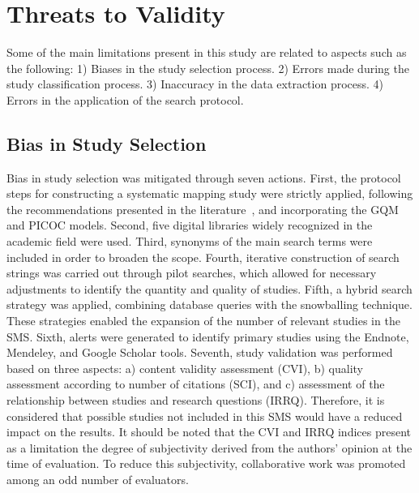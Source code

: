 \section{Threats to Validity}\label{sec:amenazas-validez}
Some of the main limitations present in this study are related to aspects such as the following: 1) Biases in the study selection process. 2) Errors made during the study classification process. 3) Inaccuracy in the data extraction process. 4) Errors in the application of the search protocol.

\subsection{Bias in Study Selection}
Bias in study selection was mitigated through seven actions.
First, the protocol steps for constructing a systematic mapping study were strictly applied, following the recommendations presented in the literature~\cite{Kitchenham2010792, budgen2008using}, and incorporating the GQM and PICOC models. Second, five digital libraries widely recognized in the academic field were used. Third, synonyms of the main search terms were included in order to broaden the scope. Fourth, iterative construction of search strings was carried out through pilot searches, which allowed for necessary adjustments to identify the quantity and quality of studies. Fifth, a hybrid search strategy was applied, combining database queries with the snowballing technique. These strategies enabled the expansion of the number of relevant studies in the SMS. Sixth, alerts were generated to identify primary studies using the Endnote, Mendeley, and Google Scholar tools. Seventh, study validation was performed based on three aspects: a) content validity assessment (CVI), b) quality assessment according to number of citations (SCI), and c) assessment of the relationship between studies and research questions (IRRQ). Therefore, it is considered that possible studies not included in this SMS would have a reduced impact on the results. It should be noted that the CVI and IRRQ indices present as a limitation the degree of subjectivity derived from the authors' opinion at the time of evaluation. To reduce this subjectivity, collaborative work was promoted among an odd number of evaluators.

